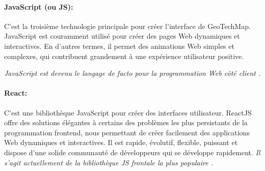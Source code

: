         \paragraph{JavaScript (ou JS): }
         C'est la troisième technologie principale pour créer 
        l'interface de GeoTechMap. JavaScript est couramment utilisé pour créer des 
        pages Web dynamiques et interactives. En d'autres termes, il permet des animations 
        Web simples et complexes, qui contribuent grandement à une expérience utilisateur 
        positive.
        \par
        \textit{JavaScript est devenu le langage de facto pour la programmation Web côté client \cite{gardner2012towards}.}
        \paragraph{React: }
        C'est une bibliothèque JavaScript pour créer des interfaces utilisateur.
        ReactJS offre des solutions élégantes à certains des problèmes les plus 
        persistants de la programmation frontend, nous permettant de créer facilement 
        des applications Web dynamiques et interactives. Il est rapide, évolutif, flexible, 
        puissant et dispose d’une solide communauté de développeurs qui se développe 
        rapidement. \textit{Il s'agit actuellement de la bibliothèque JS frontale la plus populaire \cite{aggarwal2018modern}.}  
        \par    
